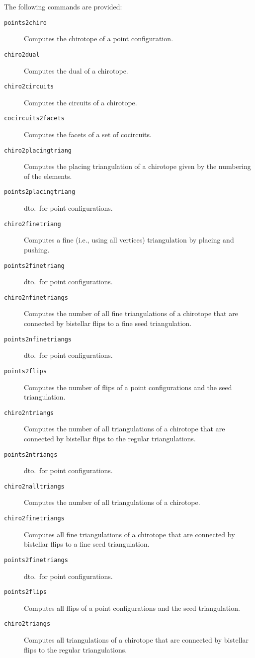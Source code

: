 \documentclass[12pt,a4paper]{article}
\begin{document}
The following commands are provided:
\begin{description}
\item[\texttt{points2chiro}] Computes the chirotope of a point configuration.
\item[\texttt{chiro2dual}] Computes the dual of a chirotope.
\item[\texttt{chiro2circuits}] Computes the circuits of a chirotope.
\item[\texttt{cocircuits2facets}] Computes the facets of a set of cocircuits.
\item[\texttt{chiro2placingtriang}] Computes the placing triangulation of a
  chirotope given by the numbering of the elements.
\item[\texttt{points2placingtriang}] dto.\ for point configurations.
\item[\texttt{chiro2finetriang}] Computes a fine (i.e., using all vertices)
  triangulation by placing and pushing.
\item[\texttt{points2finetriang}] dto.\ for point configurations.
\item[\texttt{chiro2nfinetriangs}] Computes the number of all fine
  triangulations of a chirotope that are connected by bistellar flips to a fine
  seed triangulation.
\item[\texttt{points2nfinetriangs}] dto.\ for point configurations.
\item[\texttt{points2flips}] Computes the number of flips of a point
  configurations and the seed triangulation.
\item[\texttt{chiro2ntriangs}] Computes the number of all triangulations of a
  chirotope that are connected by bistellar flips to the regular triangulations.
\item[\texttt{points2ntriangs}] dto.\ for point configurations.
\item[\texttt{chiro2nalltriangs}] Computes the number of all triangulations of a
  chirotope.
\item[\texttt{chiro2finetriangs}] Computes all fine triangulations of a
  chirotope that are connected by bistellar flips to a fine seed
  triangulation.
\item[\texttt{points2finetriangs}] dto.\ for point configurations.
\item[\texttt{points2flips}] Computes all flips of a point configurations and the
  seed triangulation.
\item[\texttt{chiro2triangs}] Computes all triangulations of a chirotope that
  are connected by bistellar flips to the regular triangulations.

\end{description}
\end{document}
